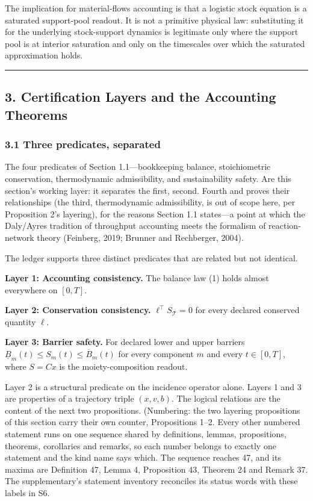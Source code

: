 \documentclass[11pt]{article}
\begin{document}
The implication for material-flows accounting is that a logistic stock equation is a saturated support-pool readout. It is not a primitive physical law: substituting it for the underlying stock-support dynamics is legitimate only where the support pool is at interior saturation and only on the timescales over which the saturated approximation holds.

\begin{center}\rule{0.5\linewidth}{0.5pt}\end{center}

\subsection{3. Certification Layers and the Accounting
Theorems}\label{certification-layers-and-the-accounting-theorems}

\subsubsection{3.1 Three predicates,
separated}\label{three-predicates-separated}

The four predicates of Section 1.1---bookkeeping balance, stoichiometric conservation, thermodynamic admissibility, and sustainability safety. Are this section's working layer: it separates the first, second. Fourth and proves their relationships (the third, thermodynamic admissibility, is out of scope here, per Proposition 2's layering), for the reasons Section 1.1 states---a point at which the Daly/\allowbreak{}Ayres tradition of throughput accounting meets the formalism of reaction-network theory (Feinberg, 2019; Brunner and Rechberger, 2004).

The ledger supports three distinct predicates that are related but not
identical.

\textbf{Layer 1: Accounting consistency.} The balance law (1) holds
almost everywhere on \([0,T]\).

\textbf{Layer 2: Conservation consistency.}
\(\ell^\top S_{\mathcal{T}} = 0\) for every declared conserved quantity
\(\ell\).

\textbf{Layer 3: Barrier safety.} For declared lower and upper barriers
\(\underline{B}_m(t) \le S_m(t) \le \overline{B}_m(t)\) for every
component \(m\) and every \(t \in [0,T]\), where \(S = Cx\) is the
moiety-composition readout.

Layer 2 is a structural predicate on the incidence operator alone. Layers 1 and 3 are properties of a trajectory triple \((x, v, b)\). The logical relations are the content of the next two propositions. (Numbering: the two layering propositions of this section carry their own counter, Propositions 1--2. Every other numbered statement runs on one sequence shared by definitions, lemmas, propositions, theorems, corollaries and remarks, so each number belongs to exactly one statement and the kind name says which. The sequence reaches 47, and its maxima are Definition 47, Lemma 4, Proposition 43, Theorem 24 and Remark 37. The supplementary's statement inventory reconciles its status words with these labels in S6.
\end{document}
